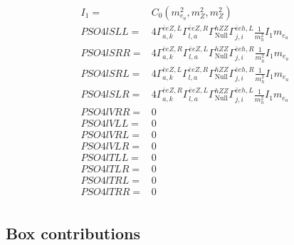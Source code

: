 \documentclass[A4,landscape]{article}
\begin{document}
\begin{align} 
I_1= & C_0(m^2_{e_{{a}}}, m^2_{Z}, m^2_{Z}) \\ 
  PSO4lSLL= & 4  \Gamma^{\bar{e}e Z ,L}_{a, k} \Gamma^{\bar{e}e Z ,R}_{l, a} \Gamma^{h Z Z }_\text{Null} \Gamma^{\bar{e}e h ,L}_{j, i} \frac{1}{m^2_{h}} I_1 m_{e_{{a}}} \\ 
  PSO4lSRR= & 4  \Gamma^{\bar{e}e Z ,R}_{a, k} \Gamma^{\bar{e}e Z ,L}_{l, a} \Gamma^{h Z Z }_\text{Null} \Gamma^{\bar{e}e h ,R}_{j, i} \frac{1}{m^2_{h}} I_1 m_{e_{{a}}} \\ 
  PSO4lSRL= & 4  \Gamma^{\bar{e}e Z ,L}_{a, k} \Gamma^{\bar{e}e Z ,R}_{l, a} \Gamma^{h Z Z }_\text{Null} \Gamma^{\bar{e}e h ,R}_{j, i} \frac{1}{m^2_{h}} I_1 m_{e_{{a}}} \\ 
  PSO4lSLR= & 4  \Gamma^{\bar{e}e Z ,R}_{a, k} \Gamma^{\bar{e}e Z ,L}_{l, a} \Gamma^{h Z Z }_\text{Null} \Gamma^{\bar{e}e h ,L}_{j, i} \frac{1}{m^2_{h}} I_1 m_{e_{{a}}} \\ 
  PSO4lVRR= & 0 \\ 
  PSO4lVLL= & 0 \\ 
  PSO4lVRL= & 0 \\ 
  PSO4lVLR= & 0 \\ 
  PSO4lTLL= & 0 \\ 
  PSO4lTLR= & 0 \\ 
  PSO4lTRL= & 0 \\ 
  PSO4lTRR= & 0 \\ 
\end{align} 
\subsection{Box contributions} 
\end{document}
